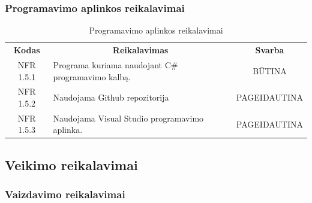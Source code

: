 \documentclass{VUMIFPSkursinis}
\begin{document}
\subsubsection{Programavimo aplinkos reikalavimai}

\begin{center}
	\begin{table}[H]
	\caption{Programavimo aplinkos reikalavimai}
	\begin{tabular}{|p{2cm}|p{}|p{}|}
	\hline
	    \rowcolor{lightgray}
		\multicolumn{3}{|c|}{Programavimo aplinkos reikalavimai}\\
		
	\hline
		\multicolumn{1}{|c|}{{\bfseries Kodas}}&
		\multicolumn{1}{|c|}{{\bfseries Reikalavimas}}&
		\multicolumn{1}{|c|}{{\bfseries Svarba}}\\
	\hline 	
		\multicolumn{1}{|c|}{NFR 1.5.1}&
		{Programa kuriama naudojant C\# programavimo kalbą.}&
		\multicolumn{1}{|c|}{BŪTINA}\\	
	
	\hline 	
		\multicolumn{1}{|c|}{NFR 1.5.2}&
		{Naudojama Github repozitorija }&
		\multicolumn{1}{|p{1.5cm}|}{PAGEIDAUTINA}\\		
	
	\hline 	
		\multicolumn{1}{|c|}{NFR 1.5.3}&
		{Naudojama Visual Studio programavimo aplinka.}&
		\multicolumn{1}{|p{1.5cm}|}{PAGEIDAUTINA}\\		
	
	\hline 	 	 	
	\end{tabular}
	
	\label{table:Programavimoaplinkosreikalavimai}
	\end{table}

\end{center}

\subsection{Veikimo reikalavimai}

\subsubsection{Vaizdavimo reikalavimai}
\end{document}
